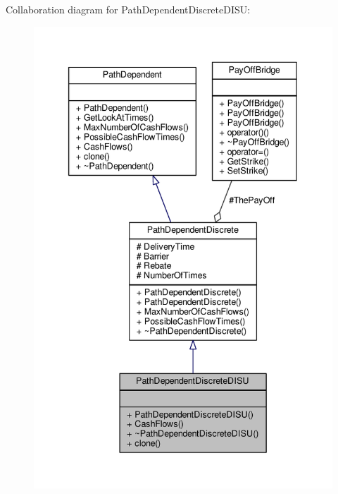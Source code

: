 Collaboration diagram for Path\+Dependent\+Discrete\+D\+I\+SU\+:
\nopagebreak
\begin{figure}[H]
\begin{center}
\leavevmode
\includegraphics[width=340pt]{classPathDependentDiscreteDISU__coll__graph}
\end{center}
\end{figure}
